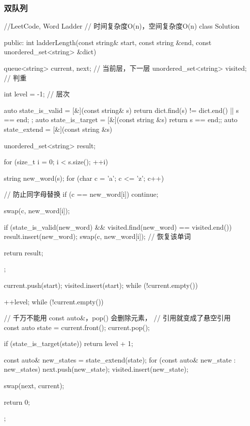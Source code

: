\subsubsection{双队列}
\begin{Code}
//LeetCode, Word Ladder
// 时间复杂度O(n)，空间复杂度O(n)
class Solution {
public:
    int ladderLength(const string& start, const string &end,
            const unordered_set<string> &dict) {
        queue<string> current, next;    // 当前层，下一层
        unordered_set<string> visited;  // 判重

        int level = -1;  // 层次

        auto state_is_valid = [&](const string& s) {
            return dict.find(s) != dict.end() || s == end;
        };
        auto state_is_target = [&](const string &s) {return s == end;};
        auto state_extend = [&](const string &s) {
            unordered_set<string> result;

            for (size_t i = 0; i < s.size(); ++i) {
                string new_word(s);
                for (char c = 'a'; c <= 'z'; c++) {
                    // 防止同字母替换
                    if (c == new_word[i]) continue;

                    swap(c, new_word[i]);

                    if (state_is_valid(new_word) &&
                        visited.find(new_word) == visited.end()) {
                        result.insert(new_word);
                    }
                    swap(c, new_word[i]); // 恢复该单词
                }
            }

            return result;
        };

        current.push(start);
        visited.insert(start);
        while (!current.empty()) {
            ++level;
            while (!current.empty()) {
                // 千万不能用 const auto&，pop() 会删除元素，
                // 引用就变成了悬空引用
                const auto state = current.front();
                current.pop();

                if (state_is_target(state)) {
                    return level + 1;
                }

                const auto& new_states = state_extend(state);
                for (const auto& new_state : new_states) {
                    next.push(new_state);
                    visited.insert(new_state);
                }
            }
            swap(next, current);
        }
        return 0;
    }
};
\end{Code}


